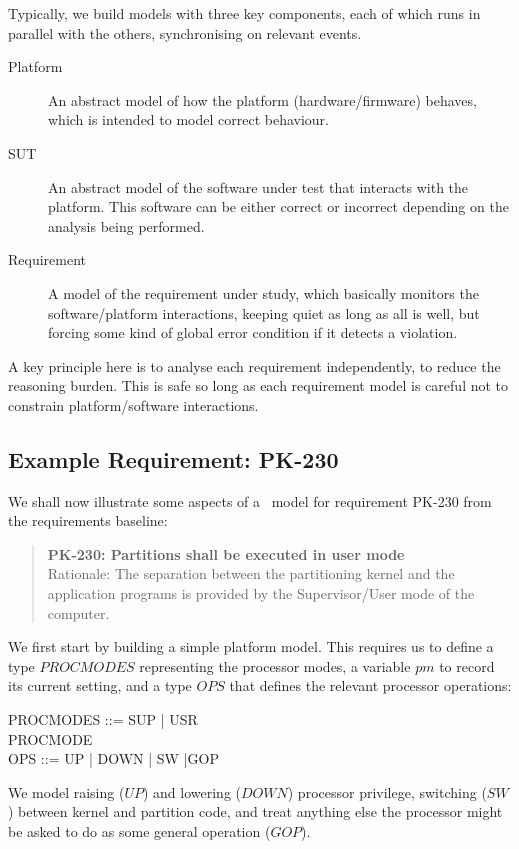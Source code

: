 Typically, we build models with three key components,
each of which runs in parallel with the others,
synchronising on relevant events.
\begin{description}
  \item [Platform]
    An abstract model of how the platform (hardware/firmware) behaves,
    which is intended to model correct behaviour.
  \item [SUT]
   An abstract model of the software under test that interacts
   with the platform.
   This software can be either correct or incorrect depending on
   the analysis being performed.
  \item [Requirement]
   A model of the requirement under study, which basically monitors
   the software/platform interactions, keeping quiet as long as all is well,
   but forcing some kind of global error condition if it detects a violation.
\end{description}
A key principle here is to analyse each requirement independently,
to reduce the reasoning burden.
This is safe so long as each requirement model is careful not
to constrain platform/software interactions.

\subsection{Example Requirement: PK-230}

We shall now illustrate some aspects of a \Circus\ model
for requirement PK-230 from the requirements baseline\cite{IMAKQP-D02}:
\begin{quote}
  \textbf{\textsf{PK-230: Partitions shall be executed in user mode}}
  \\
  \textsf{Rationale: The separation between the partitioning kernel and the
  application programs is provided
  by the Supervisor/User mode of the computer.}
\end{quote}

We first start by building a simple platform model.
This requires us to define a type $PROCMODES$ representing the processor modes,
a variable $pm$ to record its current setting,
and a type $OPS$ that defines the relevant processor operations:
\begin{circus}
PROCMODES ::= SUP | USR \\
PROCMODE  \\
OPS ::= UP | DOWN | SW |GOP
\end{circus}
We model raising ($UP$) and lowering ($DOWN$) processor privilege,
switching ($SW$) between kernel and partition code,
and treat anything else the processor might be asked to do as some
general operation ($GOP$).

